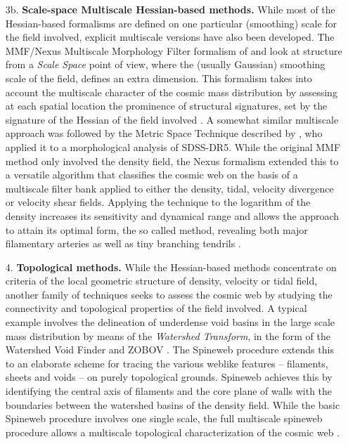 \begin{itemize}
\item[3b.] {\bf Scale-space Multiscale Hessian-based methods.} While most of the Hessian-based formalisms are defined 
on one particular (smoothing) scale for the field involved, explicit multiscale versions have also been developed. 
The MMF/Nexus Multiscale Morphology Filter formalism of \cite{Aragon-Calvo2007} and \cite{Cautun2013}  look at structure from a {\it Scale Space} point of view, where the  (usually Gaussian) smoothing scale of the field, defines an extra dimension.
This formalism takes into account the multiscale character of the 
cosmic mass distribution by assessing at each spatial location the prominence of structural signatures, set by the signature of the Hessian of 
the field involved \citep{Aragon-Calvo2007,Cautun2013}. A somewhat similar multiscale approach was followed by the Metric Space Technique described 
by \cite{Wu2009}, who applied it to a morphological analysis of SDSS-DR5.  While the original MMF method \citep{Aragon-Calvo2007} only 
involved the density field, the Nexus formalism extended this to a versatile algorithm that classifies the cosmic web on the basis 
of a multiscale filter bank applied to  either the density, tidal, velocity divergence or velocity shear fields. Applying the technique to the logarithm of the density increases its sensitivity and dynamical range and allows the approach to attain its optimal form, the so called \nexus{} method, revealing both major filamentary arteries as 
well as tiny branching tendrils \citep{Cautun2013}. 

\item[4.] {\bf Topological methods.} While the Hessian-based methods concentrate on criteria of the local geometric structure of density, 
velocity or tidal field, another family of techniques seeks to assess the cosmic web by studying the connectivity and topological 
properties of the field involved. A typical example involves the delineation of underdense void basins in the large scale mass 
distribution by means of the {\it Watershed Transform}, in the form of the Watershed Void Finder \citep{Platen2007} and ZOBOV 
\citep{Neyrinck2008}. The Spineweb procedure \citep{Aragon-Calvo2010a} extends this to an elaborate scheme for tracing the various 
weblike features -- filaments, sheets and voids -- on purely topological grounds. Spineweb achieves this by identifying the 
central axis of filaments and the core plane of walls with the boundaries between the watershed basins of the density field. 
While the basic Spineweb procedure involves one single scale, the full multiscale spineweb procedure allows a multiscale topological 
characterization of the cosmic web \citep{Aragon-Calvo2010,Aragon-Calvo2010a}. 


\end{itemize}
